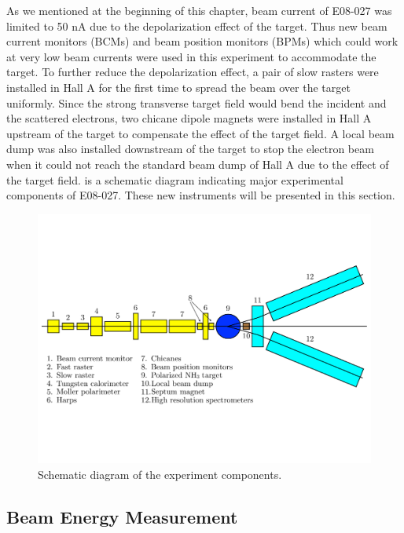 As we mentioned at the beginning of this chapter, beam current of E08-027 was limited to 50 nA due to the depolarization effect of the target. Thus new beam current monitors (BCMs) and beam position monitors (BPMs) which could work at very low beam currents were used in this experiment to accommodate the target. To further reduce the depolarization effect, a pair of slow rasters were installed in Hall A for the first time to spread the beam over the target uniformly. Since the strong transverse target field would bend the incident and the scattered electrons, two chicane dipole magnets were installed in Hall A upstream of the target to compensate the effect of the target field. A local beam dump was also installed downstream of the target to stop the electron beam when it could not reach the standard beam dump of Hall A due to the effect of the target field.  is a schematic diagram indicating major experimental components of E08-027. These new instruments will be presented in this section.

\begin{figure}[b!]
  \centering
  \includegraphics[width=\textwidth]{figs/experiment-setup.pdf}
  \caption[Schematic diagram of the experiment components.]{Schematic diagram of the experiment components. \label{C5S2F1}}
\end{figure}

\subsection{Beam Energy Measurement}
\label{C5S2SS1}

